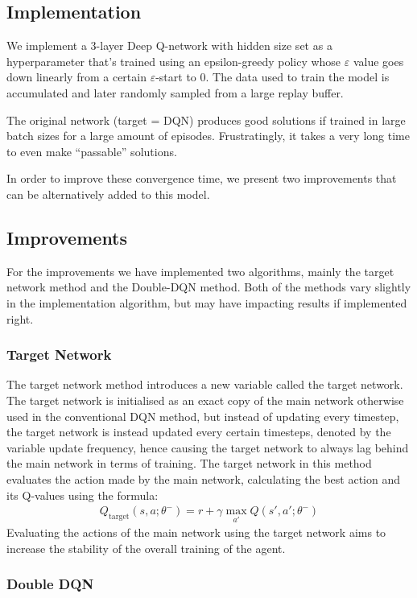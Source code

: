 \subsection{Implementation}
We implement a 3-layer Deep Q-network with hidden size set as a hyperparameter that's trained using an epsilon-greedy policy whose $\varepsilon$ value goes down linearly from a certain $\varepsilon$-start to 0.
The data used to train the model is accumulated and later randomly sampled from a large replay buffer.

The original network (target = DQN) produces good solutions if trained in large batch sizes for a large amount of episodes.
Frustratingly, it takes a very long time to even make ``passable'' solutions.

In order to improve these convergence time, we present two improvements that can be alternatively added to this model.


\subsection{Improvements}
For the improvements we have implemented two algorithms, mainly the target network method and the
Double-DQN method. Both of the methods vary slightly in the implementation algorithm, but may have
impacting results if implemented right.
\subsubsection{Target Network}
The target network method introduces a new variable called the target network. The target network is initialised as an exact copy of the main network otherwise used in the conventional DQN method, but instead of updating every timestep, the target network is instead updated every certain timesteps, denoted by the variable update frequency, hence causing the target network to always lag behind the main network in terms of training.
The target network in this method evaluates the action made by the main network, calculating the best action and its Q-values using the formula:
\begin{align*}
    Q_{\text{target}}(s, a ; \theta^{-}) = r + \gamma \max_{a'} Q(s', a' ; \theta^{-})
\end{align*}
Evaluating the actions of the main network using the target network aims to increase the stability of the
overall training of the agent.

\subsubsection{Double DQN}

